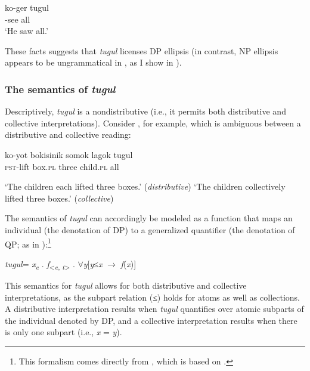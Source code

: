 \documentclass[output=paper]{LSP/langsci}
\begin{document}
\ea \label{ex:landman:tugulonown}
    \gll ko-ger tugul\\ 
	     \pst-see all\\
    \glt ‘He saw all.’
\z 

These facts suggests that \textit{tugul} licenses DP ellipsis (in contrast, NP ellipsis appears to be ungrammatical in , as I show in ).

\subsubsection{The semantics of \textit{tugul}}\label{sec:landman:tugulsem}
Descriptively, \textit{tugul} is a nondistributive  (i.e., it permits both distributive and collective interpretations). Consider , for example, which is ambiguous between a distributive and collective reading:
 
\ea \label{ex:landman:distcoll}
    \gll ko-yot bokisinik somok lagok tugul\\
         \textsc{pst}-lift box.\textsc{pl} three child.\textsc{pl} all\\ 
    \glt 
      \begin{xlist}
      \ex \label{ex:landman:dist} ‘The children each lifted three boxes.’ (\textit{distributive})
      \ex \label{ex:landman:coll} ‘The children collectively lifted three boxes.’ (\textit{collective})
      \end{xlist}
\z

The semantics of \textit{tugul} can accordingly be modeled as a function that maps an individual (the denotation of DP) to a generalized quantifier (the denotation of QP; as in \citealt{Matthewson:2001}):\footnote{This formalism comes directly from \citet{Zimmermann:2014}, which is based on \citet{Matthewson:2001}.} 

\ea \label{ex:landman:tugulden}
\textlbrackdbl\textit{tugul}\textrbrackdbl = \textlambda\textit{x}\textsubscript{\textit{e}} .  \textlambda\textit{f}\textsubscript{<\textit{e}, \textit{t}>} . $\forall$\textit{y}[\textit{y}≤\textit{x} $\rightarrow$ \textit{f}(\textit{x})]
\z

\noindent This semantics for \textit{tugul} allows for both distributive and collective interpretations, as the subpart relation (≤) holds for atoms as well as collections. A distributive interpretation results when \textit{tugul} quantifies over atomic subparts of the individual denoted by DP, and a collective interpretation results when there is only one subpart (i.e., \textit{x} = \textit{y}). 
\end{document}
